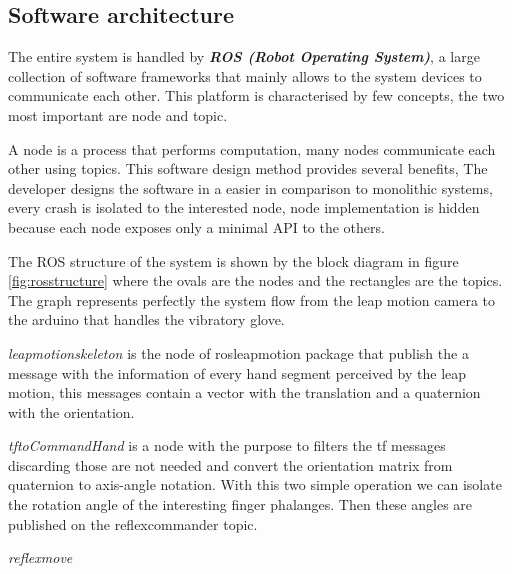 \subsection{Software architecture}

The entire system is handled by \textbf{\textit{ROS (Robot Operating System)}}, a large collection of software frameworks that mainly allows to the system devices to communicate each other. This platform is  characterised by few concepts, the two most important are node and topic. 

A node is a process that performs computation, many nodes communicate each other using topics. This software design method provides several benefits, 
The developer designs the software in a easier in comparison to monolithic systems, every crash is isolated to the interested node, node implementation is hidden because each node exposes only a minimal API to the others.

The ROS structure of the system is shown by the block diagram in figure \ref{fig:rosstructure} where the ovals are the nodes and the rectangles are the topics. 
The graph represents perfectly the system flow from the leap motion camera to the arduino that handles the vibratory glove.

\par

\textit{leap\textunderscore motion\textunderscore skeleton} is the node of rosleapmotion package that publish the a message with the information of every hand segment perceived by the leap motion, this messages contain a vector with the translation and a quaternion with the orientation.

\textit{tf\textunderscore to\textunderscore CommandHand} is a node with the purpose to filters the tf messages discarding those are not needed and convert the orientation matrix from quaternion to axis-angle notation. With this two simple operation we can isolate the rotation angle of the interesting finger phalanges. Then these angles are published on the reflex\textunderscore commander topic.

\textit{reflex\textunderscore move}





